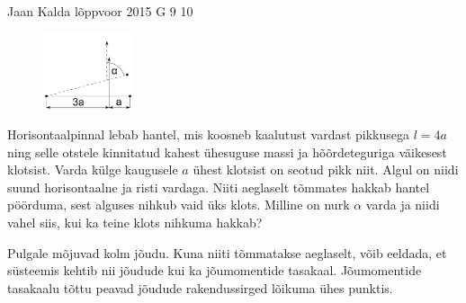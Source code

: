 {Jaan Kalda} %
{lõppvoor} %
{2015} %
{G 9} %
{10} %
{
\ifStatement
\begin{figure}%
\vspace{-5 pt}%
\includegraphics[width=0.23\textwidth]{2015-v3g-09-hantel}%
\vspace{-15 pt}%
\end{figure}
Horisontaalpinnal lebab hantel, mis koosneb kaalutust vardast pikkusega $l=4a$ ning selle otstele kinnitatud kahest ühesuguse massi ja hõõrdeteguriga väikesest klotsist. Varda külge kaugusele $a$ ühest klotsist on seotud pikk niit. Algul on niidi suund horisontaalne ja risti vardaga. Niiti aeglaselt tõmmates hakkab hantel pöörduma, sest alguses nihkub vaid üks klots. Milline on nurk $\alpha$ varda ja niidi vahel siis, kui ka teine klots nihkuma hakkab?

\fi


\ifHint
Pulgale mõjuvad kolm jõudu. Kuna niiti tõmmatakse aeglaselt, võib eeldada, et süsteemis kehtib nii jõudude kui ka jõumomentide tasakaal. Jõumomentide tasakaalu tõttu peavad jõudude rakendussirged lõikuma ühes punktis.
\fi


}
